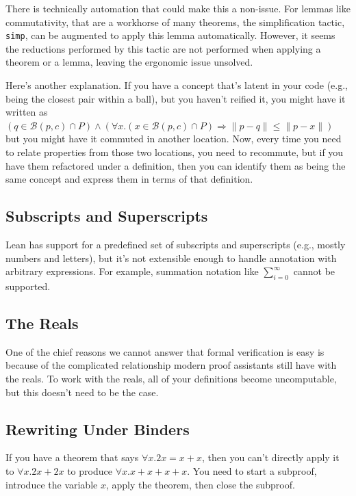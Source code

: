 \documentclass{article}
\begin{document}
There is technically automation that could make this a non-issue.
For lemmas like commutativity, that are a workhorse of many theorems, the simplification tactic, \texttt{simp}, can be augmented to apply this lemma automatically.
However, it seems the reductions performed by this tactic are not performed when applying a theorem or a lemma, leaving the ergonomic issue unsolved.

Here's another explanation.
If you have a concept that's latent in your code (e.g., being the closest pair within a ball), but you haven't reified it, you might have it written as $(q \in \mathcal{B}(p, c) \cap P) \wedge (\forall x. (x \in \mathcal{B}(p, c) \cap P) \Rightarrow \| p - q \| \leq \| p - x \|)$ but you might have it commuted in another location.
Now, every time you need to relate properties from those two locations, you need to recommute, but if you have them refactored under a definition, then you can identify them as being the same concept and express them in terms of that definition.

\subsection{Subscripts and Superscripts}
Lean has support for a predefined set of subscripts and superscripts (e.g., mostly numbers and letters), but it's not extensible enough to handle annotation with arbitrary expressions.
For example, summation notation like $\sum_{i=0}^{\infty}$ cannot be supported.

\subsection{The Reals}
One of the chief reasons we cannot answer that formal verification is easy is because of the complicated relationship modern proof assistants still have with the reals.
To work with the reals, all of your definitions become uncomputable, but this doesn't need to be the case.

\subsection{Rewriting Under Binders}
If you have a theorem that says $\forall x. 2x = x + x$, then you can't directly apply it to $\forall x. 2x + 2x$ to produce $\forall x. x + x + x + x$.
You need to start a subproof, introduce the variable $x$, apply the theorem, then close the subproof.
\end{document}
